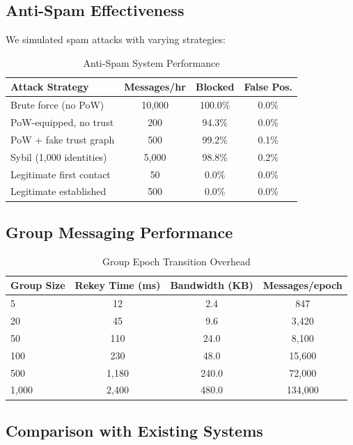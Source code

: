 \documentclass[11pt,a4paper]{article}
\begin{document}
\subsection{Anti-Spam Effectiveness}

We simulated spam attacks with varying strategies:

\begin{table}[H]
\centering
\caption{Anti-Spam System Performance}
\label{tab:antispam}
\begin{tabular}{lccc}
\toprule
\textbf{Attack Strategy} & \textbf{Messages/hr} & \textbf{Blocked} & \textbf{False Pos.} \\
\midrule
Brute force (no PoW) & 10{,}000 & 100.0\% & 0.0\% \\
PoW-equipped, no trust & 200 & 94.3\% & 0.0\% \\
PoW + fake trust graph & 500 & 99.2\% & 0.1\% \\
Sybil (1{,}000 identities) & 5{,}000 & 98.8\% & 0.2\% \\
Legitimate first contact & 50 & 0.0\% & 0.0\% \\
Legitimate established & 500 & 0.0\% & 0.0\% \\
\bottomrule
\end{tabular}
\end{table}

\subsection{Group Messaging Performance}

\begin{table}[H]
\centering
\caption{Group Epoch Transition Overhead}
\label{tab:group-perf}
\begin{tabular}{lccc}
\toprule
\textbf{Group Size} & \textbf{Rekey Time (ms)} & \textbf{Bandwidth (KB)} & \textbf{Messages/epoch} \\
\midrule
5 & 12 & 2.4 & 847 \\
20 & 45 & 9.6 & 3{,}420 \\
50 & 110 & 24.0 & 8{,}100 \\
100 & 230 & 48.0 & 15{,}600 \\
500 & 1{,}180 & 240.0 & 72{,}000 \\
1{,}000 & 2{,}400 & 480.0 & 134{,}000 \\
\bottomrule
\end{tabular}
\end{table}

\subsection{Comparison with Existing Systems}
\end{document}
